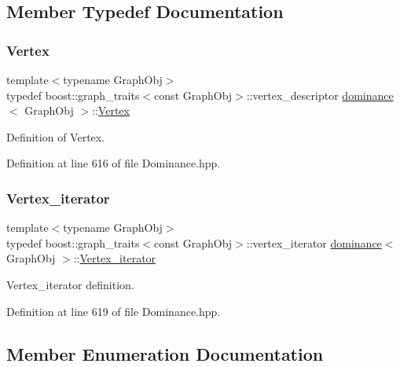\subsection{Member Typedef Documentation}
\mbox{\label{classdominance_acc73faf26e73171b15fd0ff6c63ca393}} 
\subsubsection{\texorpdfstring{Vertex}{Vertex}}
{\footnotesize\ttfamily template$<$typename Graph\+Obj$>$ \\
typedef boost\+::graph\+\_\+traits$<$const Graph\+Obj$>$\+::vertex\+\_\+descriptor \hyperlink{classdominance}{dominance}$<$ Graph\+Obj $>$\+::\hyperlink{classdominance_acc73faf26e73171b15fd0ff6c63ca393}{Vertex}\hspace{0.3cm}{\ttfamily [private]}}



Definition of Vertex. 



Definition at line 616 of file Dominance.\+hpp.

\mbox{\label{classdominance_a0a3eefc98e49cc387674d4f3224c5213}} 
\subsubsection{\texorpdfstring{Vertex\+\_\+iterator}{Vertex\_iterator}}
{\footnotesize\ttfamily template$<$typename Graph\+Obj$>$ \\
typedef boost\+::graph\+\_\+traits$<$const Graph\+Obj$>$\+::vertex\+\_\+iterator \hyperlink{classdominance}{dominance}$<$ Graph\+Obj $>$\+::\hyperlink{classdominance_a0a3eefc98e49cc387674d4f3224c5213}{Vertex\+\_\+iterator}\hspace{0.3cm}{\ttfamily [private]}}



Vertex\+\_\+iterator definition. 



Definition at line 619 of file Dominance.\+hpp.



\subsection{Member Enumeration Documentation}
\mbox{\label{classdominance_a983b27e93af6a5d375c01d81c2c30c40}} 
